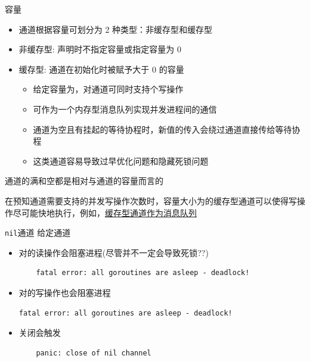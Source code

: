 \begin{frame}{容量}
    \begin{itemize}
        \item 通道根据容量可划分为 2 种类型：\alert{非缓存型}和\alert{缓存型}
        \item 非缓存型: 声明时不指定容量或指定容量为 0
        \item 缓存型: 通道在初始化时被赋予大于 0 的容量
            \begin{itemize}
                \item 给定容量为，对通道可同时支持个写操作
                \item 可作为一个内存型消息队列实现并发进程间的通信
                \item 通道为空且有挂起的等待协程时，新值的传入会绕过通道直接传给等待协程
                \item 这类通道容易\alert{导致过早优化问题}和\alert{隐藏死锁问题}
            \end{itemize}
    \end{itemize}
    通道的满和空都是相对与通道的容量而言的 


    在预知通道需要支持的并发写操作次数时，容量大小为的缓存型通道可以使得写操作尽可能快地执行，例如，\href{https://github.com/sammyne/concurrency-in-go/blob/master/chapter03/channels/buffered_channel.go}{缓存型通道作为消息队列}
\end{frame}

\begin{frame}[fragile]{\texttt{nil}通道}
    给定通道
    \begin{itemize}
        \item 对的读操作会阻塞进程(尽管并不一定会导致死锁??)
\begin{lstlisting}
    fatal error: all goroutines are asleep - deadlock!
\end{lstlisting}
        \item 对的写操作也会阻塞进程
\begin{lstlisting}
fatal error: all goroutines are asleep - deadlock!
\end{lstlisting}
        \item 关闭会触发
\begin{lstlisting}
    panic: close of nil channel 
\end{lstlisting}
    \end{itemize}
\end{frame}

